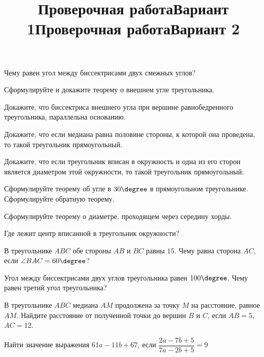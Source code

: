 \newpage
\title{Проверочная работа}
\title{Вариант 1}
\begin{listofex}
	\item
	\begin{enumcols}[itemcolumns=1]
		\item Чему равен угол между биссектрисами двух смежных углов?
		\item Сформулируйте и докажите теорему о внешнем угле треугольника.
		\item Докажите, что биссектриса внешнего угла при вершине равнобедренного треугольника, параллельна основанию.
		\item Докажите, что если медиана равна половине стороны, к которой она проведена, то такой треугольник прямоугольный.
		\item Докажите, что если треугольник вписан в окружность и одна из его сторон является диаметром этой окружности, то такой треугольник прямоугольный.
		\item Сформулируйте теорему об угле в \( 30\degree \) в прямоугольном треугольнике. Сформулируйте обратную теорему.
		\item Сформулируйте теорему о диаметре, проходящем через середину хорды.
		\item Где лежит центр вписанной в треугольник окружности?
	\end{enumcols}
	\item В треугольнике \( ABC \) обе стороны \( AB \) и \( BC \) равны \( 15 \). Чему равна сторона \( AC \), если \( \angle BAC = 60 \degree \)?
	\item Угол между биссектрисами двух углов треугольника равен \( 100\degree \). Чему равен третий угол треугольника?
	\item {}
	\item {}
	\item {}
	\item В треугольнике \( ABC \) медиана \( AM \) продолжена за точку \( M \) на расстояние, равное \( AM \). Найдите расстояние от полученной точки до вершин \( B  \) и \( C\), если \( AB = 5\), \( AC = 12\).
	\item {}
	\item {}
	\item Найти значение выражения \( 61a-11b+67 \), если \( \dfrac{2a-7b+5}{7a-2b+5}=9 \)
\end{listofex}
\newpage
\title{Проверочная работа}
\title{Вариант 2}
